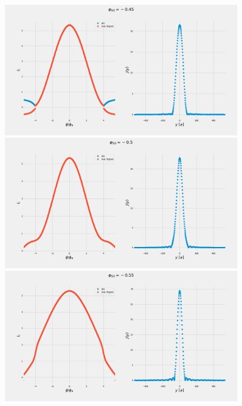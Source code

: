 \documentclass[a4paper]{article}
\begin{document}
\begin{figure}
	\includegraphics[width=0.9\textwidth]{figs/wg31/current_and_density_045}
	\includegraphics[width=0.9\textwidth]{figs/wg31/current_and_density_05}
	\includegraphics[width=0.9\textwidth]{figs/wg31/current_and_density_055}
\end{figure}
\end{document}
